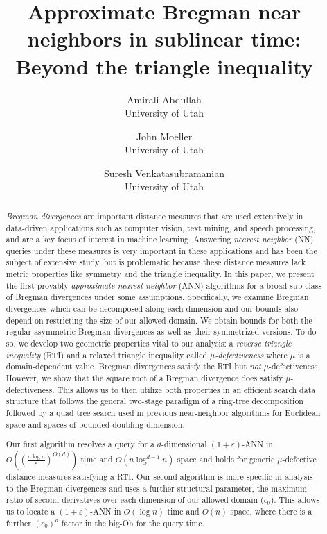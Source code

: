 \documentclass[11pt]{myclass}
\title{Approximate Bregman near neighbors in sublinear time: Beyond the triangle inequality}
\author{Amirali Abdullah\\University of Utah \and John Moeller\\University of Utah \and Suresh Venkatasubramanian\\University of Utah}
\date{}
\newcommand{\eps}{\varepsilon}
\begin{document}
\begin{titlepage}
\maketitle
\thispagestyle{empty}
\begin{abstract}
\emph{Bregman divergences} are  important distance measures that are used extensively in data-driven applications such as computer vision, text mining, and speech processing, and are a key focus of interest in machine learning. Answering \emph{nearest neighbor} (NN) queries under these measures is very important in these applications and has been the subject of extensive study, but is problematic because these distance measures  lack metric properties like symmetry and the triangle inequality.
In this paper, we present the first provably  \emph{approximate nearest-neighbor} (ANN)  algorithms for a broad sub-class of Bregman divergences under some assumptions. Specifically, we examine Bregman divergences which can be decomposed along each dimension and our bounds also depend on restricting the size of our allowed domain. We obtain bounds for both the regular asymmetric Bregman divergences as well as their symmetrized versions. 
To do so, we develop two geometric properties vital to our analysis: a \emph{reverse triangle inequality} 
(RTI) and a relaxed triangle inequality called \emph{$\mu$-defectiveness} where $\mu$ is a domain-dependent value. 
Bregman divergences  satisfy the RTI but \emph{not} $\mu$-defectiveness. However, we show that the square root of a 
Bregman divergence does satisfy $\mu$-defectiveness. This allows us to then utilize both properties in
 an efficient search data structure that follows the general two-stage paradigm of a ring-tree 
decomposition followed by a quad tree search used in previous near-neighbor algorithms for Euclidean space and spaces of bounded doubling dimension. 


Our first algorithm resolves a query for a $d$-dimensional $(1+\eps)$-ANN in $O \left(\left(\frac{\mu \log n}{\eps}\right)^{O(d)} \right)$ time and $O \left(n \log^{d-1} n \right)$ space and holds for generic $\mu$-defective distance measures satisfying a RTI. 
Our second algorithm is more specific in analysis to the Bregman divergences and uses a further structural parameter, the maximum ratio of second derivatives over each dimension of our allowed domain ($c_0$). This allows us to locate a $(1+\eps)$-ANN in $O(\log n)$ time and $O(n)$ space, where there is a further $(c_0)^d$ factor in the big-Oh for the query time.

\end{abstract}  
\end{titlepage}
\end{document}
